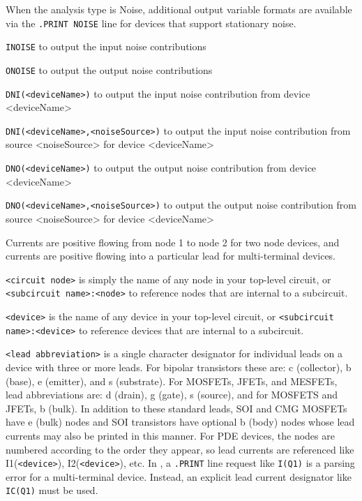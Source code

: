 \begin{Command}
\begin{Arguments}
When the analysis type is Noise, additional output variable formats are available
via the \texttt{.PRINT NOISE} line for devices that support stationary noise.
\begin{XyceItemize}
\item \texttt{INOISE} to output the input noise contributions
\item \texttt{ONOISE} to output the output noise contributions
\item \texttt{DNI(<deviceName>)} to output the input noise contribution from device <deviceName>
\item \texttt{DNI(<deviceName>,<noiseSource>)} to output the input noise contribution from
                source <noiseSource> for device <deviceName>
\item \texttt{DNO(<deviceName>)} to output the output noise contribution from device <deviceName>
\item \texttt{DNO(<deviceName>,<noiseSource>)} to output the output noise contribution from
                source <noiseSource> for device <deviceName>
\end{XyceItemize}

\end{Arguments}

\comments

\begin{XyceItemize}
\item Currents are positive flowing from node 1 to node 2 for two node
  devices, and currents are positive flowing into a particular lead for
  multi-terminal devices.

\item \texttt{<circuit node>} is simply the name of any node in your
  top-level circuit, or \texttt{<subcircuit name>:<node>} to reference
  nodes that are internal to a subcircuit.

\item \texttt{<device>} is the name of any device in your top-level
  circuit, or \texttt{<subcircuit name>:<device>} to reference devices
  that are internal to a subcircuit.

\item \texttt{<lead abbreviation>} is a single character designator for
  individual leads on a device with three or more leads.  For bipolar
  transistors these are: c (collector), b (base), e (emitter), and s
  (substrate).  For MOSFETs, JFETs, and MESFETs, lead abbreviations
  are: d (drain), g (gate), s (source), and for MOSFETS and JFETs,
  b (bulk).  In addition to these standard leads, SOI
  and CMG MOSFETs have e (bulk) nodes and SOI transistors have
  optional b (body) nodes whose lead currents may also be printed in
  this manner.  For PDE devices, the nodes are numbered according to
  the order they appear, so lead currents are referenced like
  I1(\texttt{<device>}), I2(\texttt{<device>}), etc.  In \Xyce{},
  a \texttt{.PRINT} line request like \texttt{I(Q1)} is a parsing
  error for a multi-terminal device.  Instead, an explicit lead
  current designator like \texttt{IC(Q1)} must be used.


\end{XyceItemize}
\end{Command}
